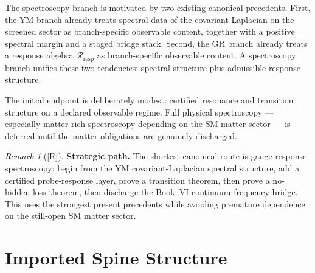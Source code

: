\documentclass[12pt,oneside]{amsbook}
\theoremstyle{plain}
\theoremstyle{definition}
\theoremstyle{remark}
\newtheorem{remark}[theorem]{Remark}
\newcommand{\status}[1]{\textup{[#1]}}
\begin{document}
The spectroscopy branch is motivated by two existing canonical
precedents. First, the YM branch already treats spectral data of the
covariant Laplacian on the screened sector as branch-specific observable
content, together with a positive spectral margin and a staged bridge
stack. Second, the GR branch already treats a response algebra
$\mathcal{R}_{\mathrm{resp}}$ as branch-specific observable content.
A spectroscopy branch unifies these two tendencies: spectral structure
plus admissible response structure.

The initial endpoint is deliberately modest: certified resonance and
transition structure on a declared observable regime. Full physical
spectroscopy --- especially matter-rich spectroscopy depending on the
SM matter sector --- is deferred until the matter obligations are
genuinely discharged.

\begin{remark}[\status{R}]\label{rem:spec-strategic-path}
\textbf{Strategic path.}
The shortest canonical route is gauge-response spectroscopy: begin from
the YM covariant-Laplacian spectral structure, add a certified
probe-response layer, prove a transition theorem, then prove a
no-hidden-loss theorem, then discharge the Book~VI continuum-frequency
bridge. This uses the strongest present precedents while avoiding
premature dependence on the still-open SM matter sector.
\end{remark}

\section{Imported Spine Structure}\label{sec:spec-imports}
\end{document}
